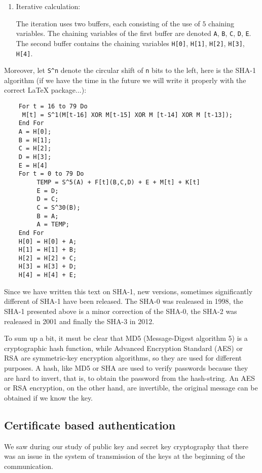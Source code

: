 \begin{enumerate}
		\item Iterative calculation:
		
		The iteration uses two buffers, each consisting of the use of $5$ chaining variables. The chaining variables of the first buffer are denoted \texttt{A}, \texttt{B}, \texttt{C}, \texttt{D}, \texttt{E}. The second buffer contains the chaining variables \texttt{H[0]}, \texttt{H[1]}, \texttt{H[2]}, \texttt{H[3]}, \texttt{H[4]}.
	\end{enumerate}

	Moreover, let \texttt{S\string^n} denote the circular shift of \texttt{n} bits to the left, here is the SHA-1 algorithm (if we have the time in the future we will write it properly with the correct LaTeX package...):
	
	\begin{verbatim}
	For t = 16 to 79 Do
     M[t] = S^1(M[t-16] XOR M[t-15] XOR M [t-14] XOR M [t-13]);
	End For
	A = H[0];
	B = H[1]; 
	C = H[2];
	D = H[3]; 
	E = H[4]
	For t = 0 to 79 Do
	     TEMP = S^5(A) + F[t](B,C,D) + E + M[t] + K[t]
	     E = D; 
	     D = C; 
	     C = S^30(B); 
	     B = A; 
	     A = TEMP;
	End For
	H[0] = H[0] + A;
	H[1] = H[1] + B; 
	H[2] = H[2] + C; 
	H[3] = H[3] + D; 
	H[4] = H[4] + E;
	\end{verbatim}
	\begin{tcolorbox}[title=Remark,colframe=black,arc=10pt]
	Since we have written this text on SHA-1, new versions, sometimes significantly different of SHA-1 have been released. The SHA-0 was realeased in 1998, the SHA-1 presented above is a minor correction of the SHA-0, the SHA-2 was realeased in 2001 and finally the SHA-3 in 2012.
	\end{tcolorbox}
		
	To sum up a bit, it msut be clear that MD5 (Message-Digest algorithm 5) is a cryptographic hash function, while Advanced Encryption Standard (AES) or RSA are symmetric-key encryption algorithms, so they are used for different purposes. A hash, like MD5 or SHA are used to verify passwords because they are hard to invert, that is, to obtain the password from the hash-string. An AES or RSA encryption, on the other hand, are invertible, the original message can be obtained if we know the key. 
	
	
	\subsection{Certificate based authentication}
	We saw during our study of public key and secret key cryptography that there was an issue in the system of transmission of the keys at the beginning of the communication.

